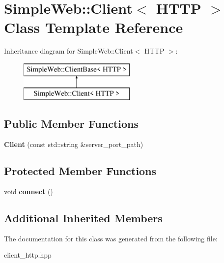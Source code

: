 \hypertarget{a00054}{}\section{Simple\+Web\+:\+:Client$<$ H\+T\+TP $>$ Class Template Reference}
\label{a00054}
Inheritance diagram for Simple\+Web\+:\+:Client$<$ H\+T\+TP $>$\+:\begin{figure}[H]
\begin{center}
\leavevmode
\includegraphics[height=2.000000cm]{a00054}
\end{center}
\end{figure}
\subsection*{Public Member Functions}
\begin{DoxyCompactItemize}
\item 
{\bfseries Client} (const std\+::string \&server\+\_\+port\+\_\+path)\hypertarget{a00054_a47655afc849e459096743876391dae17}{}\label{a00054_a47655afc849e459096743876391dae17}

\end{DoxyCompactItemize}
\subsection*{Protected Member Functions}
\begin{DoxyCompactItemize}
\item 
void {\bfseries connect} ()\hypertarget{a00054_aebed110274c94b539e2d0a857c24991d}{}\label{a00054_aebed110274c94b539e2d0a857c24991d}

\end{DoxyCompactItemize}
\subsection*{Additional Inherited Members}


The documentation for this class was generated from the following file\+:\begin{DoxyCompactItemize}
\item 
client\+\_\+http.\+hpp\end{DoxyCompactItemize}
